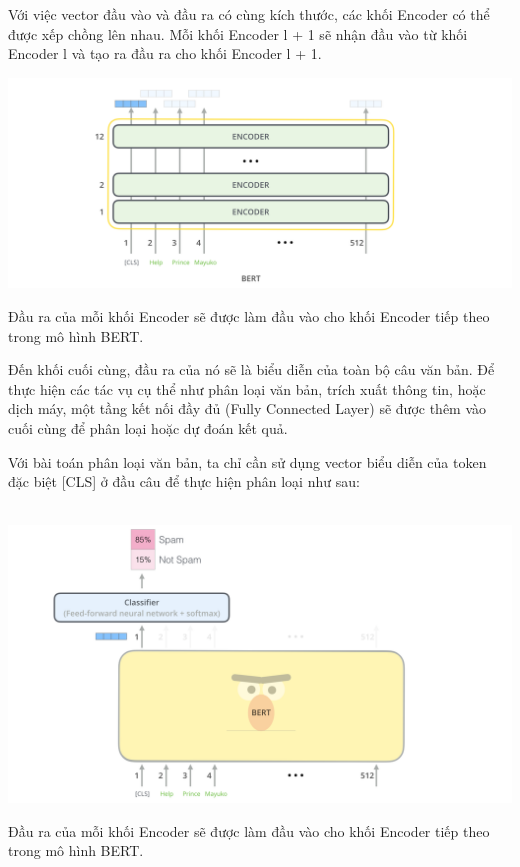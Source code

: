 \documentclass[a4paper, 12pt, openany]{book}
\begin{document}
Với việc vector đầu vào và đầu ra có cùng kích thước, các khối Encoder có thể được xếp chồng lên nhau. Mỗi khối Encoder l + 1 sẽ nhận đầu vào từ khối Encoder l và tạo ra đầu ra cho khối Encoder l + 1.

\begin{minipage}{\linewidth}
    \captionsetup{type=figure}
    \centering
    \includegraphics[width=.8\linewidth]{./assets/images/BERT-stack-encoder.png}
    \caption{Đầu ra của mỗi khối Encoder sẽ được làm đầu vào cho khối Encoder tiếp theo trong mô hình BERT.}
\end{minipage}
\vspace{0.5cm}

Đến khối cuối cùng, đầu ra của nó sẽ là biểu diễn của toàn bộ câu văn bản. Để thực hiện các tác vụ cụ thể như phân loại văn bản, trích xuất thông tin, hoặc dịch máy, một tầng kết nối đầy đủ (Fully Connected Layer) sẽ được thêm vào cuối cùng để phân loại hoặc dự đoán kết quả. 

Với bài toán phân loại văn bản, ta chỉ cần sử dụng vector biểu diễn của token đặc biệt [CLS] ở đầu câu để thực hiện phân loại như sau:

\begin{minipage}{\linewidth}
    \captionsetup{type=figure}\    
    \centering
    \includegraphics[width=.8\linewidth]{./assets/images/BERT-classification.png}
    \caption{Đầu ra của mỗi khối Encoder sẽ được làm đầu vào cho khối Encoder tiếp theo trong mô hình BERT.}
    \label{fig:bert_classification}
\end{minipage}
\vspace{0.5cm}
\end{document}
